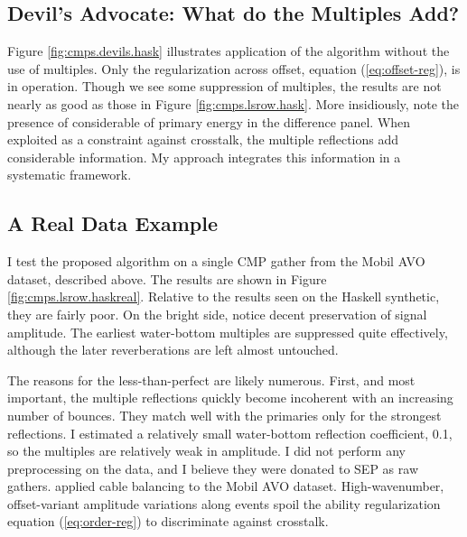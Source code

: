 \subsection{Devil's Advocate: What do the Multiples Add?}
Figure \ref{fig:cmps.devils.hask} illustrates application of the algorithm without the use of
multiples.  Only the regularization across offset, equation (\ref{eq:offset-reg}), is in operation.  
Though we see some suppression of multiples, the results are not nearly as good as those in Figure 
\ref{fig:cmps.lsrow.hask}.  More insidiously, note the presence of considerable of primary energy
in the difference panel.  When exploited as a constraint against crosstalk, the
multiple reflections add considerable information.  My approach integrates this information 
in a systematic framework.

\subsection{A Real Data Example}
I test the proposed algorithm on a single CMP gather from the Mobil AVO dataset, described
above.  The results are shown in Figure \ref{fig:cmps.lsrow.haskreal}.  Relative to the results 
seen on the Haskell synthetic, they are fairly poor.  On the bright side, notice decent preservation
of signal amplitude.  The earliest water-bottom multiples are suppressed quite effectively, although
the later reverberations are left almost untouched.
\par
The reasons for the less-than-perfect are likely numerous.  First, and most important, the multiple
reflections quickly become incoherent with an increasing number of bounces.  They match well with the 
primaries only for the strongest reflections.  I estimated a relatively small water-bottom reflection
coefficient, 0.1, so the multiples are relatively weak in amplitude.  I did not perform any preprocessing
on the data, and I believe they were donated to SEP as raw gathers.  
applied cable balancing to the Mobil AVO dataset.  High-wavenumber, offset-variant amplitude variations 
along events spoil the ability regularization equation (\ref{eq:order-reg}) to discriminate against
crosstalk.

